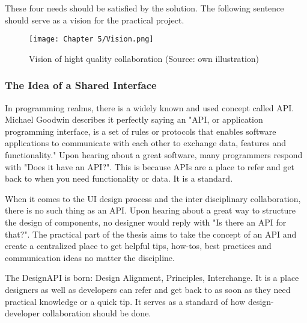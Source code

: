 These four needs should be satisfied by the solution. The following sentence should serve as a
vision for the practical project.

\begin{figure}[H]
      \centering
      \texttt{[image: Chapter 5/Vision.png]}
      \caption{Vision of hight quality collaboration (Source: own illustration)}
\end{figure}

\subsubsection{The Idea of a Shared Interface}


In programming realms, there is a widely known and used concept called API. Michael Goodwin
describes it perfectly saying an "API, or application programming interface, is a set of rules or
protocols that enables software applications to communicate with each other to exchange data,
features and functionality."  Upon hearing about a
great software, many programmers respond with "Does it have an API?". This is because APIs are a place to
refer and get back to when you need functionality or data. It is a standard.

When it comes to the UI design process and the inter disciplinary collaboration, there is no such
thing as an API. Upon hearing about a great way to structure the design of components, no designer
would reply with "Is there an API for that?". The practical part of the thesis aims to take the
concept of an API and create a centralized place to get helpful tips, how-tos, best practices and
communication ideas no matter the discipline.

The DesignAPI is born: Design Alignment, Principles, Interchange. It is a place designers as well as
developers can refer and get back to as soon as they need practical knowledge or a quick tip. It
serves as a standard of how design-developer collaboration should be done.

